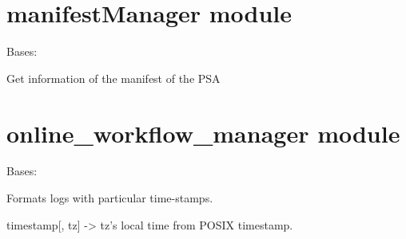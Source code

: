 \documentclass[letterpaper,10pt,oneside]{sphinxmanual}
\begin{document}
\chapter{manifestManager module}
\label{manifestManager:manifestmanager-module}\label{manifestManager::doc}\label{manifestManager:module-manifestManager}

\begin{fulllineitems}
\label{manifestManager:manifestManager.ManifestManager}
Bases: 

\begin{fulllineitems}
\label{manifestManager:manifestManager.ManifestManager.getManifest}
Get information of the manifest of the PSA

\end{fulllineitems}


\end{fulllineitems}



\chapter{online\_workflow\_manager module}
\label{online_workflow_manager:module-online_workflow_manager}\label{online_workflow_manager::doc}\label{online_workflow_manager:online-workflow-manager-module}

\begin{fulllineitems}
\label{online_workflow_manager:online_workflow_manager.MyFormatter}
Bases: 

Formats logs with particular time-stamps.

\begin{fulllineitems}
\label{online_workflow_manager:online_workflow_manager.MyFormatter.converter}
timestamp{[}, tz{]} -\textgreater{} tz's local time from POSIX timestamp.

\end{fulllineitems}


\begin{fulllineitems}
\label{online_workflow_manager:online_workflow_manager.MyFormatter.formatTime}
\end{fulllineitems}


\end{fulllineitems}
\end{document}
